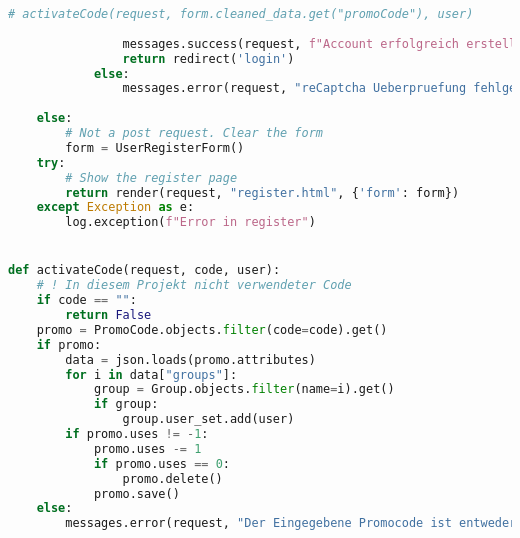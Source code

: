\begin{lstlisting}[language=Python]
                    # activateCode(request, form.cleaned_data.get("promoCode"), user)
                
                messages.success(request, f"Account erfolgreich erstellt!")
                return redirect('login')
            else:
                messages.error(request, "reCaptcha Ueberpruefung fehlgeschlagen. Versuche es bitte erneut.")
            
    else:
        # Not a post request. Clear the form
        form = UserRegisterForm()
    try:
        # Show the register page
        return render(request, "register.html", {'form': form})
    except Exception as e:
        log.exception(f"Error in register")


def activateCode(request, code, user):
    # ! In diesem Projekt nicht verwendeter Code
    if code == "":
        return False
    promo = PromoCode.objects.filter(code=code).get()
    if promo:
        data = json.loads(promo.attributes)
        for i in data["groups"]:
            group = Group.objects.filter(name=i).get()
            if group:
                group.user_set.add(user)
        if promo.uses != -1:
            promo.uses -= 1
            if promo.uses == 0:
                promo.delete()
            promo.save()
    else:
        messages.error(request, "Der Eingegebene Promocode ist entweder falsch geschrieben oder nicht existent")
        

\end{lstlisting}